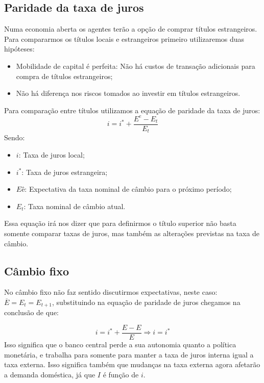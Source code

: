 \documentclass[12pt,a4paper,oneside,brazil]{abntex2}
\begin{document}
\subsection{Paridade da taxa de juros}
Numa economia aberta os agentes terão a opção de comprar títulos estrangeiros. Para compararmos os títulos locais e estrangeiros primeiro utilizaremos duas hipóteses:
\begin{itemize}
\item Mobilidade de capital é perfeita: Não há custos de transação adicionais para compra de títulos estrangeiros;
\item Não há diferença nos riscos tomados ao investir em títulos estrangeiros.
\end{itemize}
Para comparação entre títulos utilizamos a equação de paridade da taxa de juros:
\[ i = i^* + \frac{E^e - E_t}{E_t} \]
Sendo: 
\begin{itemize}
\item $i$: Taxa de juros local;
\item $i^*$: Taxa de juros estrangeira;
\item $Eê$: Expectativa da taxa nominal de câmbio para o próximo período;
\item $E_t$: Taxa nominal de câmbio atual.
\end{itemize}
Essa equação irá nos dizer que para definirmos o título superior não basta somente comparar taxas de juros, mas também as alterações previstas na taxa de câmbio.
\subsection{Câmbio fixo}
No câmbio fixo não faz sentido discutirmos expectativas, neste caso: $ \overline{E} = E_{t} = E_{t+1}$, substituindo na equação de paridade de juros chegamos na conclusão de que:

\begin{equation}\label{Fixo}
i = i^{*} + \frac{E - E}{E} \Rightarrow  i = i^{*}
\end{equation}
Isso significa que o banco central perde a sua autonomia quanto a política monetária, e trabalha para somente para manter a taxa de juros interna igual a taxa externa. Isso significa também que mudanças na taxa externa agora afetarão a demanda doméstica, já que $I$ é função de $i$.
\end{document}
